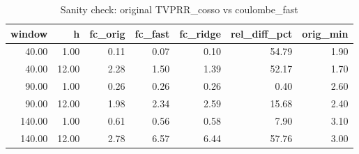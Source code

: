 \begin{table}[ht]
\centering
\begin{tabular}{rrrrrrr}
  \hline
window & h & fc\_orig & fc\_fast & fc\_ridge & rel\_diff\_pct & orig\_min \\ 
  \hline
40.00 & 1.00 & 0.11 & 0.07 & 0.10 & 54.79 & 1.90 \\ 
  40.00 & 12.00 & 2.28 & 1.50 & 1.39 & 52.17 & 1.70 \\ 
  90.00 & 1.00 & 0.26 & 0.26 & 0.26 & 0.40 & 2.60 \\ 
  90.00 & 12.00 & 1.98 & 2.34 & 2.59 & 15.68 & 2.40 \\ 
  140.00 & 1.00 & 0.61 & 0.56 & 0.58 & 7.90 & 3.10 \\ 
  140.00 & 12.00 & 2.78 & 6.57 & 6.44 & 57.76 & 3.00 \\ 
   \hline
\end{tabular}
\caption{Sanity check: original TVPRR_cosso vs coulombe_fast} 
\label{tab:sanity_coulombe}
\end{table}
